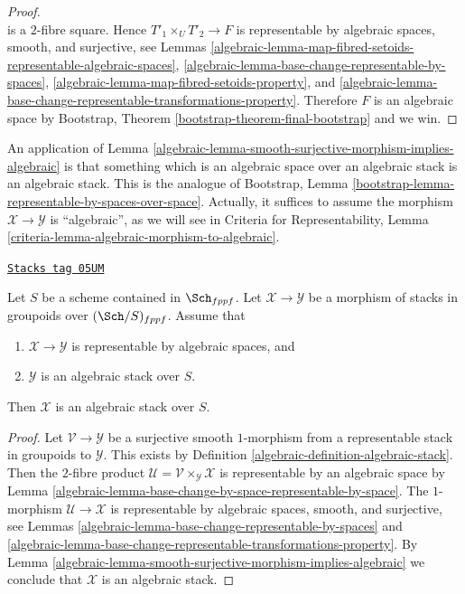 \begin{proof}
$$$$
is a $2$-fibre square.
Hence $T'_1 \times_U T'_2 \to F$ is representable by algebraic spaces,
smooth, and surjective, see
Lemmas \ref{algebraic-lemma-map-fibred-setoids-representable-algebraic-spaces},
\ref{algebraic-lemma-base-change-representable-by-spaces},
\ref{algebraic-lemma-map-fibred-setoids-property}, and
\ref{algebraic-lemma-base-change-representable-transformations-property}.
Therefore $F$ is an algebraic space by
Bootstrap, Theorem \ref{bootstrap-theorem-final-bootstrap}
and we win.
\end{proof}

An application of
Lemma \ref{algebraic-lemma-smooth-surjective-morphism-implies-algebraic}
is that something which is an algebraic space over an algebraic stack
is an algebraic stack. This is the analogue of
Bootstrap, Lemma \ref{bootstrap-lemma-representable-by-spaces-over-space}.
Actually, it suffices to assume the morphism
$\mathcal{X} \to \mathcal{Y}$ is ``algebraic'', as we will see in
Criteria for Representability,
Lemma \ref{criteria-lemma-algebraic-morphism-to-algebraic}.

\begin{lemma}
\label{algebraic-lemma-representable-morphism-to-algebraic}
\href{https://stacks.math.columbia.edu/tag/05UM}{\texttt{Stacks tag 05UM}}

Let $S$ be a scheme contained in $\Sch_{fppf}$.
Let $\mathcal{X} \to \mathcal{Y}$ be a morphism of stacks in groupoids
over $(\Sch/S)_{fppf}$. Assume that
\begin{enumerate}
\item $\mathcal{X} \to \mathcal{Y}$ is representable by algebraic spaces, and
\item $\mathcal{Y}$ is an algebraic stack over $S$.
\end{enumerate}
Then $\mathcal{X}$ is an algebraic stack over $S$.
\end{lemma}

\begin{proof}

Let $\mathcal{V} \to \mathcal{Y}$ be a surjective smooth $1$-morphism
from a representable stack in groupoids to $\mathcal{Y}$. This exists by
Definition \ref{algebraic-definition-algebraic-stack}.
Then the $2$-fibre product
$\mathcal{U} = \mathcal{V} \times_{\mathcal Y} \mathcal X$
is representable by an algebraic space by
Lemma \ref{algebraic-lemma-base-change-by-space-representable-by-space}.
The $1$-morphism $\mathcal{U} \to \mathcal X$ is representable by algebraic
spaces, smooth, and surjective, see
Lemmas \ref{algebraic-lemma-base-change-representable-by-spaces} and
\ref{algebraic-lemma-base-change-representable-transformations-property}.
By
Lemma \ref{algebraic-lemma-smooth-surjective-morphism-implies-algebraic}
we conclude that $\mathcal{X}$ is an algebraic stack.
\end{proof}

